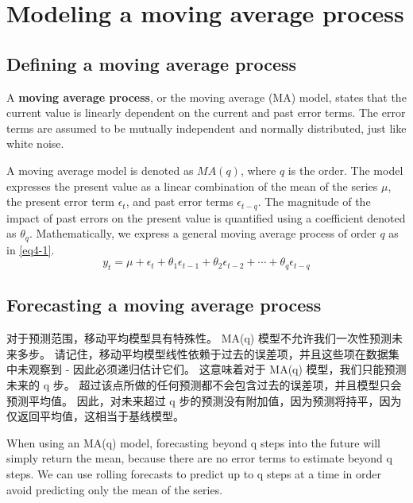 \chapter{Modeling a moving average process\label{ch04}}
\section{Defining a moving average process}
A \textbf{moving average process}, or the moving average (MA) model, states that the current value is linearly dependent on the current and past error terms. The error terms are assumed to be mutually independent and normally distributed, just like white noise.

A moving average model is denoted as $MA(q)$, where $q$ is the order. The model expresses the present value as a linear combination of the mean of the series $\mu$, the present error term $\epsilon_t$, and past error terms $\epsilon_{t-q}$. The magnitude of the impact of past errors on the present value is quantified using a coefficient denoted as $\theta_q$. Mathematically, we express a general moving average process of order $q$ as in \autoref{eq4-1}.
\begin{equation}\label{eq4-1}
    y_t=\mu+\epsilon_t+\theta_1\epsilon_{t-1}+\theta_2\epsilon_{t-2}+\cdots+\theta_q\epsilon_{t-q}
\end{equation}
\section{Forecasting a moving average process}
对于预测范围，移动平均模型具有特殊性。 MA(q) 模型不允许我们一次性预测未来多步。 请记住，移动平均模型线性依赖于过去的误差项，并且这些项在数据集中未观察到 - 因此必须递归估计它们。 这意味着对于 MA(q) 模型，我们只能预测未来的 q 步。 超过该点所做的任何预测都不会包含过去的误差项，并且模型只会预测平均值。 因此，对未来超过 q 步的预测没有附加值，因为预测将持平，因为仅返回平均值，这相当于基线模型。
\begin{tcolorbox}[title=Forecasting using the MA(q) model]
    When using an MA(q) model, forecasting beyond q steps into the future will simply return the mean, because there are no error terms to estimate beyond q steps. We can use rolling forecasts to predict up to q steps at a time in order avoid predicting only the mean of the series.
\end{tcolorbox}
